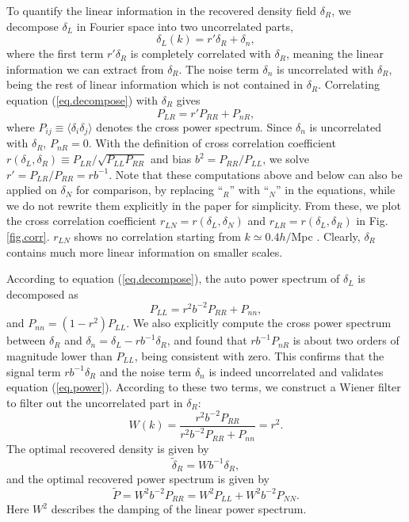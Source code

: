 \documentclass[aps,prd,twocolumn,superscriptaddress,amsfont,amssymb,amsmath,nofootinbib,showpacs,balancelastpage]{revtex4-1}
\begin{document}
To quantify the linear information in the recovered density field $\delta_R$,
we decompose $\delta_L$ in Fourier space into two uncorrelated parts,
\begin{equation}\label{eq.decompose}
    \delta_L(k)=r'\delta_R+\delta_n,
\end{equation}
where the first term $r'\delta_R$ is completely correlated with $\delta_R$,
meaning the linear information we can extract from $\delta_R$.
The noise term $\delta_n$ is uncorrelated with $\delta_R$, being
the rest of linear information which is not contained in $\delta_R$.
Correlating equation (\ref{eq.decompose}) with $\delta_R$ gives
\begin{equation}
    P_{LR}=r'P_{RR}+P_{nR},
\end{equation}
where $P_{ij}\equiv\langle\delta_i\delta_j\rangle$ denotes the cross power 
spectrum. Since $\delta_n$ is uncorrelated with $\delta_R$, $P_{nR}=0$. With the 
definition of cross correlation coefficient $r(\delta_L,\delta_R)\equiv P_{LR}/\sqrt{P_{LL}P_{RR}}$ 
and bias $b^2=P_{RR}/P_{LL}$, we solve $r'=P_{LR}/P_{RR}=rb^{-1}$.
Note that these computations above and below can also be applied on $\delta_N$ for
comparison, by replacing ``$_R$'' with ``$_N$'' in the equations,
while we do not rewrite them explicitly
in the paper for simplicity. From these, we plot the cross 
correlation coefficient $r_{LN}=r(\delta_L,\delta_N)$ and
$r_{LR}=r(\delta_L,\delta_R)$ in Fig.\ref{fig.corr}.
$r_{LN}$ shows no correlation starting from $k\simeq 0.4 h/$Mpc \citep{2004MNRAS.355..129S}.
Clearly, $
\delta_R$ contains much more linear information on smaller scales.

According to equation (\ref{eq.decompose}), the auto power spectrum of $\delta_L$ is decomposed as
\begin{equation}\label{eq.power}
    P_{LL}=r^2b^{-2}P_{RR}+P_{nn},
\end{equation}
and $P_{nn}=(1-r^2)P_{LL}$. We also explicitly
compute the cross power spectrum between $\delta_R$ and $\delta_n=\delta_L-rb^{-1}\delta_R$,
and found that $rb^{-1}P_{nR}$ is about two orders of magnitude lower than $P_{LL}$,
being consistent with zero. This confirms that
the signal term $rb^{-1}\delta_R$ and the noise term $\delta_n$
is indeed uncorrelated and validates equation (\ref{eq.power}).
According to these two terms, we construct a Wiener filter to filter
out the uncorrelated part in $\delta_R$:
\begin{equation}
    W(k)=\frac{r^2b^{-2}P_{RR}}{r^2b^{-2}P_{RR}+P_{nn}}=r^2.
\end{equation}
The optimal recovered density is given by
\begin{equation}
    \tilde\delta_R=Wb^{-1}\delta_R,
\end{equation}
and the optimal recovered power spectrum is given by
\begin{equation}\label{eq.opt}
    \tilde P=W^2b^{-2}P_{RR}=W^2P_{LL}+W^2b^{-2}P_{NN}.
\end{equation}
Here $W^2$ describes the damping of the linear power spectrum.
\end{document}
